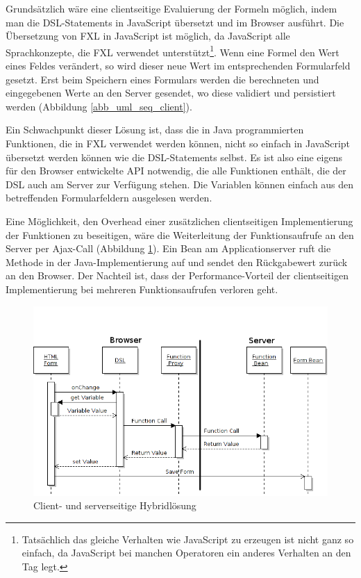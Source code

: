 Grundsätzlich wäre eine clientseitige Evaluierung der Formeln möglich, indem man die DSL-Statements in Java\-Script übersetzt und im Browser ausführt. Die Übersetzung von FXL in Java\-Script ist möglich, da Java\-Script alle Sprachkonzepte, die FXL verwendet unterstützt\footnote{Tatsächlich das gleiche Verhalten wie Java\-Script zu erzeugen ist nicht ganz so einfach, da Java\-Script bei manchen Operatoren ein anderes Verhalten an den Tag legt.}. Wenn eine Formel den Wert eines Feldes verändert, so wird dieser neue Wert im ent\-sprech\-enden Formularfeld gesetzt. Erst beim Speichern eines Formulars werden die berechneten und eingegebenen Werte an den Server gesendet, wo diese validiert und persistiert werden (Abbildung \ref{abb_uml_seq_client}).

Ein Schwachpunkt dieser Lösung ist, dass die in Java programmierten Funktionen, die in FXL verwendet werden können, nicht so einfach in Java\-Script übersetzt werden können wie die DSL-Statements selbst. Es ist also eine eigens für den Browser entwickelte API not\-wen\-dig, die alle Funktionen enthält, die der DSL auch am Server zur Verfügung stehen. Die Variablen können einfach aus den betreffenden Formularfeldern ausgelesen werden.

Eine Möglichkeit, den Overhead einer zusätzlichen clientseitigen Implementierung der Funktionen zu beseitigen, wäre die Weiterleitung der Funktionsaufrufe an den Server per Ajax-Call (Abbildung \ref{abb_uml_seq_client_hybrid}). Ein Bean am Applicationserver ruft die Methode in der Java-Implementierung auf und sendet den Rückgabewert zurück an den Browser. Der Nachteil ist, dass der Performance-Vorteil der clientseitigen Implementierung bei mehreren Funktionsaufrufen verloren geht.

\begin{figure}[h]
\begin{center}
\includegraphics[scale=0.55]{figures/uml_seq_client_hybrid_neu}
\end{center}

\caption{Client- und serverseitige Hybridlösung}
\label{abb_uml_seq_client_hybrid}
\end{figure}

